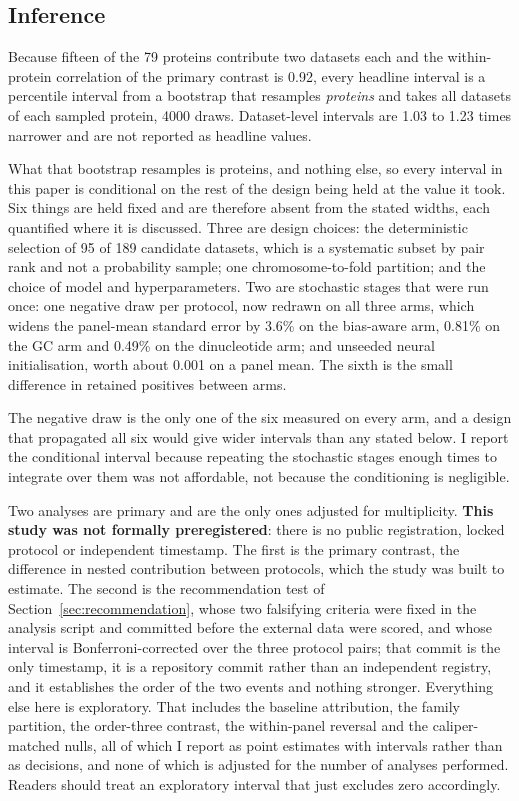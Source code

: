 \subsection{Inference}
\label{sec:inference}

Because fifteen of the 79 proteins contribute two datasets each and the within-protein
correlation of the primary contrast is 0.92, every headline interval is a percentile interval
from a bootstrap that resamples \emph{proteins} and takes all datasets of each sampled protein,
4000 draws. Dataset-level intervals are 1.03 to 1.23 times narrower and are not reported as
headline values.

What that bootstrap resamples is proteins, and nothing else, so every interval in this paper is
conditional on the rest of the design being held at the value it took. Six things are held
fixed and are therefore absent from the stated widths, each quantified where it is discussed.
Three are design choices: the deterministic selection of 95 of 189 candidate datasets, which is
a systematic subset by pair rank and not a probability sample; one chromosome-to-fold partition;
and the choice of model and hyperparameters. Two are stochastic stages that were run once: one
negative draw per protocol, now redrawn on all three arms, which widens the panel-mean standard
error by 3.6\% on the bias-aware arm, 0.81\% on the GC arm and 0.49\% on the dinucleotide arm;
and unseeded neural initialisation, worth about 0.001 on a panel mean. The sixth is the small
difference in retained positives between arms.

The negative draw is the only one of the six measured on every arm, and a design that propagated
all six would give wider intervals than any stated below. I report the conditional interval
because repeating the stochastic stages enough times to integrate over them was not affordable,
not because the conditioning is negligible.

Two analyses are primary and are the only ones adjusted for multiplicity. \textbf{This study
was not formally preregistered}: there is no public registration, locked protocol or independent
timestamp. The first is the primary contrast, the
difference in nested contribution between protocols, which the study was built to estimate. The
second is the recommendation test of Section~\ref{sec:recommendation}, whose two falsifying
criteria were fixed in the analysis script and committed before the external data were scored,
and whose interval is Bonferroni-corrected over the three protocol pairs; that commit is the
only timestamp, it is a repository commit rather than an independent registry, and it
establishes the order of the two events and nothing stronger. Everything else here is
exploratory. That
includes the baseline attribution, the family partition, the order-three contrast, the
within-panel reversal and the caliper-matched nulls, all of which I report as point estimates
with intervals rather than as decisions, and none of which is adjusted for the number of
analyses performed. Readers should treat an exploratory interval that just excludes zero
accordingly.

